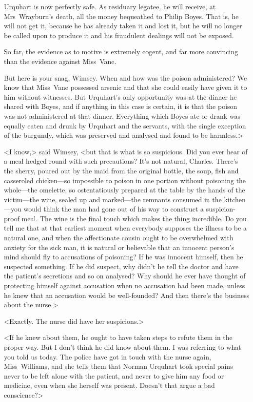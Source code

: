 Urquhart is now perfectly safe. As residuary legatee, he will receive, at Mrs~Wrayburn's death, all the money bequeathed to Philip Boyes. That is, he will not get it, because he has already taken it and lost it, but he will no longer be called upon to produce it and his fraudulent dealings will not be exposed.

So far, the evidence as to motive is extremely cogent, and far more convincing than the evidence against Miss~Vane.

But here is your snag, Wimsey. When and how was the poison administered? We know that Miss~Vane possessed arsenic and that she could easily have given it to him without witnesses. But Urquhart's only opportunity was at the dinner he shared with Boyes, and if anything in this case is certain, it is that the poison was not administered at that dinner. Everything which Boyes ate or drank was equally eaten and drunk by Urquhart and the servants, with the single exception of the burgundy, which was preserved and analysed and found to be harmless.>

<I know,> said Wimsey, <but that is what is so suspicious. Did you ever hear of a meal hedged round with such precautions? It's not natural, Charles. There's the sherry, poured out by the maid from the original bottle, the soup, fish and casseroled chicken—so impossible to poison in one portion without poisoning the whole—the omelette, so ostentatiously prepared at the table by the hands of the victim—the wine, sealed up and marked—the remnants consumed in the kitchen—you would think the man had gone out of his way to construct a suspicion-proof meal. The wine is the final touch which makes the thing incredible. Do you tell me that at that earliest moment when everybody supposes the illness to be a natural one, and when the affectionate cousin ought to be overwhelmed with anxiety for the sick man, it is natural or believable that an innocent person's mind should fly to accusations of poisoning? If he was innocent himself, then he suspected something. If he did suspect, why didn't he tell the doctor and have the patient's secretions and so on analysed? Why should he ever have thought of protecting himself against accusation when no accusation had been made, unless he knew that an accusation would be well-founded? And then there's the business about the nurse.>

<Exactly. The nurse did have her suspicions.>

<If he knew about them, he ought to have taken steps to refute them in the proper way. But I don't think he did know about them. I was referring to what you told us today. The police have got in touch with the nurse again, Miss~Williams, and she tells them that Norman Urquhart took special pains never to be left alone with the patient, and never to give him any food or medicine, even when she herself was present. Doesn't that argue a bad conscience?>

